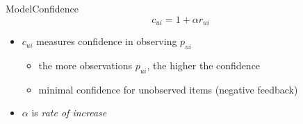 \documentclass[aspectratio=1610]{beamer}
\begin{document}
\begin{frame}{Model}{Confidence}
    \begin{equation*}
        c_{ui} = 1 + \alpha r_{ui}
    \end{equation*}
    \begin{itemize}
        \item $c_{ui}$ measures confidence in observing $p_{ui}$
        \begin{itemize}
            \item the more observations $p_{ui}$, the higher the confidence
            \item minimal confidence for unobserved items (negative feedback)
        \end{itemize}
        \item $\alpha$ is \textit{rate of increase}
    \end{itemize}
\end{frame}
\end{document}

